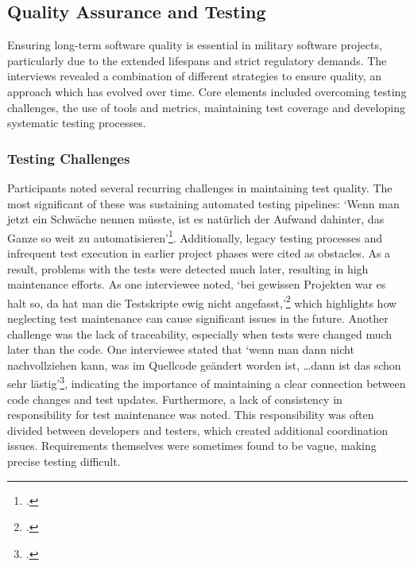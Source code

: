 \subsection{Quality Assurance and Testing}
Ensuring long-term software quality is essential in military software projects, particularly due to the extended lifespans and strict regulatory demands. The interviews revealed a combination of different strategies to ensure quality, an approach which has evolved over time.
Core elements included overcoming testing challenges, the use of tools and metrics, maintaining test coverage and developing systematic testing processes.

\subsubsection{Testing Challenges}
Participants noted several recurring challenges in maintaining test quality. The most significant of these was sustaining automated testing pipelines: `Wenn man jetzt ein Schwäche nennen müsste, ist es natürlich der Aufwand dahinter, das Ganze so weit zu automatisieren'\footcite{Interview32025}.
Additionally, legacy testing processes and infrequent test execution in earlier project phases were cited as obstacles. As a result, problems with the tests were detected much later, resulting in high maintenance efforts. 
As one interviewee noted, `bei gewissen Projekten war es halt so, da hat man die Testskripte ewig nicht angefasst,'\footcite{Interview12025} which highlights how neglecting test maintenance can cause significant issues in the future.
Another challenge was the lack of traceability, especially when tests were changed much later than the code. One interviewee stated that `wenn man dann nicht nachvollziehen kann, was im Quellcode geändert worden ist, \ldots dann ist das schon sehr lästig'\footcite{Interview12025}, indicating
the importance of maintaining a clear connection between code changes and test updates. Furthermore, a lack of consistency in responsibility for test maintenance was noted.
This responsibility was often divided between developers and testers, which created additional coordination issues.
Requirements themselves were sometimes found to be vague, making precise testing difficult.

